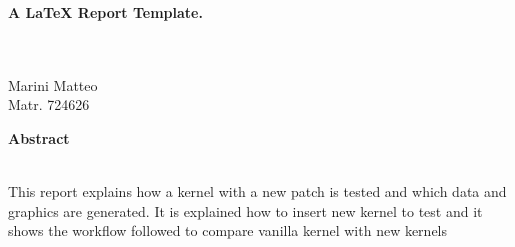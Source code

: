 \documentclass[a4paper,10pt]{article}
\newenvironment*{mytitle}{\begin{LARGE}\bf}{\end{LARGE}\\[1.5ex]}%
\newenvironment*{myabstract}{\begin{Large}\bf}{\end{Large}\\[2.5ex]}%
\begin{document}
\begin{mytitle} A LaTeX Report Template. \end{mytitle}
%
%
\\
\hspace{10ex}
Marini Matteo\\
Matr. 724626\\[10ex]

\begin{myabstract} Abstract \end{myabstract}
This report explains how a kernel with a new patch is tested and 
which data and graphics are generated. It is explained how to insert new kernel to test
and it shows the workflow followed to compare vanilla kernel with new kernels
\end{document}
